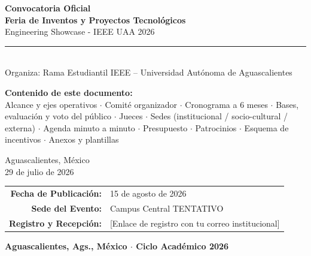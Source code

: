 \documentclass[11pt,letterpaper]{article}
\title{}
\date{}
\begin{document}
\begin{titlepage}
\centering
\vspace*{1.2cm}

{\Huge\bfseries\color{ieeedark} Convocatoria Oficial 
\\[20pt]
Feria de Inventos y Proyectos Tecnológicos}\\[10pt]
{\Large\color{ieeeblue} Engineering Showcase - IEEE UAA 2026}\\[25pt]

\rule{0.7\textwidth}{1.2pt}\\[10pt]
{\large Organiza: Rama Estudiantil IEEE -- Universidad Autónoma de Aguascalientes}\\[30pt]

\begin{tcolorbox}[colback=lightblue, colframe=ieeeblue, width=0.85\textwidth, arc=4pt]
\centering
\textbf{Contenido de este documento:}\\[4pt]
Alcance y ejes operativos $\cdot$ Comité organizador $\cdot$ Cronograma a 6 meses $\cdot$
Bases, evaluación y voto del público $\cdot$ Jueces $\cdot$ Sedes (institucional / socio-cultural / externa) $\cdot$
Agenda minuto a minuto $\cdot$ Presupuesto $\cdot$ Patrocinios $\cdot$ Esquema de incentivos $\cdot$ Anexos y plantillas
\end{tcolorbox}

\vfill

{\large Aguascalientes, México}\\
{\large 29 de julio de 2026}\\[10pt]


\tableofcontents


\begin{center}
\begin{tabularx}{0.85\textwidth}{@{}r X@{}}
\textbf{Fecha de Publicación:} & 15 de agosto de 2026 \\
\textbf{Sede del Evento:} & Campus Central TENTATIVO \\
\textbf{Registro y Recepción:} & [Enlace de registro con tu correo institucional] \\
\end{tabularx}
\end{center}

\vspace*{1cm}
{\large\bfseries Aguascalientes, Ags., México $\cdot$ Ciclo Académico 2026}
\end{titlepage}


\newpage
\end{document}

